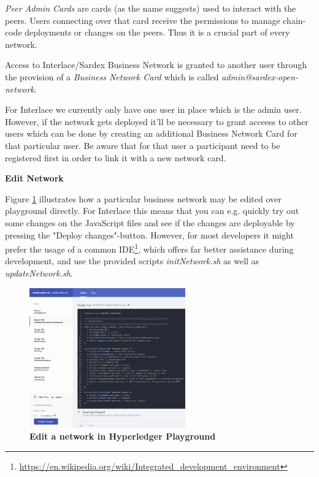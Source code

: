 \textit{Peer Admin Cards} are cards (as the name suggests) used to interact with the peers. Users connecting over that card receive the permissions to manage chain-code deployments or changes on the peers. Thus it is a crucial part of every network.

Access to Interlace/Sardex Business Network is granted to another user through the provision of a \textit{Business Network Card} which is called \textit{admin@sardex-open-network}.

For Interlace we currently only have one user in place which is the admin user. However, if the network gets deployed it'll be necessary to grant acceess to other users which can be done by creating an additional Business Network Card for that particular user. Be aware that for that user a participant need to be registered first in order to link it with a new network card.

\textbf{Edit Network}

Figure \ref{fig:edit-network} illustrates how a particular business network may be edited over playground directly. For Interlace this means that you can e.g. quickly try out some changes on the JavaScript files and see if the changes are deployable by pressing the "Deploy changes"-button. However, for most developers it might prefer the usage of a common IDE\footnote{\url{https://en.wikipedia.org/wiki/Integrated_development_environment}}, which offers far better assistance during development, and use the provided scripts \textit{initNetwork.sh} as well as \textit{updateNetwork.sh}.

\begin{figure}[htbp]
  \centering
  \includegraphics[width=0.6\textwidth]{Figures/edit-network}
  \caption{\bf\small Edit a network in Hyperledger Playground}
  \label{fig:edit-network}
\end{figure}


